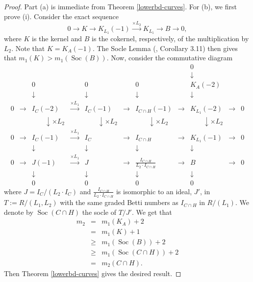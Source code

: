 \documentclass[12pt,twoside]{amsart}
\numberwithin{equation}{section}
\DeclareMathOperator{\Soc}{Soc}
\theoremstyle{definition}
\begin{document}
\begin{proof}
Part (a) is immediate from Theorem \ref{lowerbd-curves}.  For (b), we first
prove (i). Consider the exact sequence
\[
0 \rightarrow K \rightarrow K_{L_1}(-1) \stackrel{\times
L_2}{\longrightarrow} K_{L_1} \rightarrow B \rightarrow 0,
\]
where $K$ is the kernel and $B$ is the cokernel, respectively, of the multiplication by
$L_2$. Note that $K = K_A(-1)$.  The Socle Lemma (\cite{HU}, Corollary 3.11) then gives
that $m_1(K)
> m_1(\Soc(B))$.  Now, consider the commutative diagram
\[
\begin{array}{cccccccccccccccccccc}
&&&&&&&&0 \\
&&&&&&&& \downarrow \\
&& 0 && 0 && 0 && K_A(-2) \\
&& \downarrow && \downarrow && \downarrow && \downarrow \\
0 & \rightarrow & I_C(-2) & \stackrel{\times L_1}{\longrightarrow} & I_C(-1) &
\rightarrow & I_{C \cap H}(-1) & \rightarrow & K_{L_1}(-2) & \rightarrow & 0\\
&& \phantom {\times L_2} \downarrow { \times L_2} && \phantom {\times
L_2} \downarrow { \times L_2} && \phantom {\times L_2} \downarrow {
\times L_2} && \phantom {\times L_2} \downarrow { \times L_2} \\
0 & \rightarrow & I_C(-1) & \stackrel{\times L_1}{\longrightarrow} & I_C &
\rightarrow & I_{C \cap H} & \rightarrow & K_{L_1} (-1) & \rightarrow & 0 \\
&& \downarrow && \downarrow && \downarrow && \downarrow \\
0 & \rightarrow & J(-1) & \stackrel{\times L_1}{\longrightarrow} & J &
\rightarrow & \displaystyle \frac{I_{C \cap H}}{L_2 \cdot I_{C\cap H}} &
\rightarrow & B & \rightarrow & 0 \\
&& \downarrow && \downarrow && \downarrow && \downarrow \\
&& 0 && 0 && 0 && 0
\end{array}
\]
where $J = I_C / (L_2 \cdot I_C)$ and $\frac{I_{C \cap H}}{L_2 \cdot I_{C\cap
H}}$ is isomorphic to an ideal, $J'$, in $T := R/(L_1,L_2)$ with the same graded
Betti numbers as $I_{C \cap H}$ in $R/(L_1)$.  We denote by $\Soc (C \cap H)$
the socle of $T/J'$.   We get that
\[
\begin{array}{rcl}
m_2 & = & m_1(K_A) +2 \\
& = & m_1(K) +1 \\
& \geq & m_1(\Soc(B)) +2 \\
& \geq & m_1(\Soc(C \cap H)) +2 \\
& = & m_2(C \cap H).
\end{array}
\]
Then Theorem \ref{lowerbd-curves} gives the desired result.


\end{proof}
\end{document}
